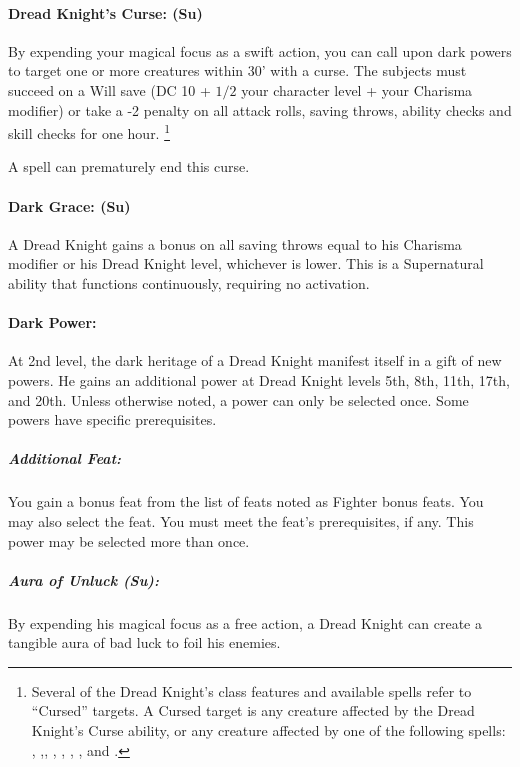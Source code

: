 \paragraph[Dread Knight's Curse]{Dread Knight's Curse: (Su)}
\label{sec:DreadKnightsCurse}
By expending your magical focus as a swift action, you can call upon dark powers to target one or more creatures within 30' with a curse.
The subjects must succeed on a Will save (DC 10 + $1/2$ your character level + your Charisma modifier) or take a -2 penalty on all attack rolls, saving throws, ability checks and skill checks for one hour.
\footnote{Several of the Dread Knight's class features and available spells refer to ``Cursed'' targets. A Cursed target is any creature affected by the Dread Knight's Curse ability, or any creature affected by one of the following spells: , ,, , , , ,  and .}

A  spell can prematurely end this curse.

\paragraph{Dark Grace: (Su)} A Dread Knight gains a bonus on all saving throws equal to his Charisma modifier or his Dread Knight level, whichever is lower.
This is a Supernatural ability that functions continuously, requiring no activation.

\paragraph{Dark Power:}
At 2nd level, the dark heritage of a Dread Knight manifest itself in a gift of new powers. He gains an additional power at Dread Knight levels 5th, 8th, 11th, 17th, and 20th. Unless otherwise noted, a power can only be selected once. Some powers have specific prerequisites.

\subparagraph{Additional Feat:}
You gain a bonus feat from the list of feats noted as Fighter bonus feats. You may also select the  feat. You must meet the feat's prerequisites, if any.
This power may be selected more than once.

\subparagraph{Aura of Unluck (Su):} 
By expending his magical focus as a free action, a Dread Knight can create a tangible aura of bad luck to foil his enemies. 

